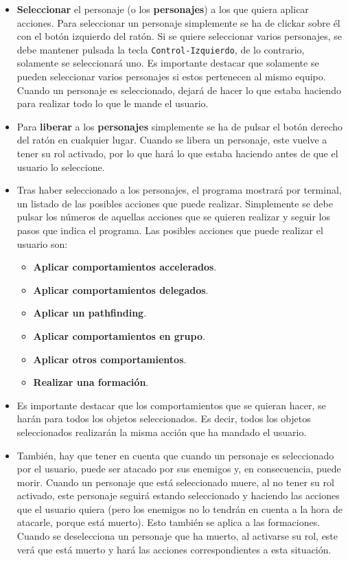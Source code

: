 \begin{itemize}
 \item \textbf{Seleccionar} el personaje (o los \textbf{personajes}) a los que quiera aplicar acciones. Para seleccionar un personaje simplemente se ha de clickar sobre él con el botón izquierdo del ratón. Si se quiere seleccionar varios personajes, se debe mantener pulsada la tecla \texttt{Control-Izquierdo}, de lo contrario, solamente se seleccionará uno. Es importante destacar que solamente se pueden seleccionar varios personajes si estos pertenecen al mismo equipo. Cuando un personaje es seleccionado, dejará de hacer lo que estaba haciendo para realizar todo lo que le mande el usuario.
 
 \item Para \textbf{liberar} a los \textbf{personajes} simplemente se ha de pulsar el botón derecho del ratón en cualquier lugar. Cuando se libera un personaje, este vuelve a tener su rol activado, por lo que hará lo que estaba haciendo antes de que el usuario lo seleccione. 
 
 \item Tras haber seleccionado a los personajes, el programa mostrará por terminal, un listado de las posibles acciones que puede realizar. Simplemente se debe pulsar los números de aquellas acciones que se quieren realizar y seguir los pasos que indica el programa. Las posibles acciones que puede realizar el usuario son:
 \begin{itemize}
  \item \textbf{Aplicar comportamientos accelerados}.
  \item \textbf{Aplicar comportamientos delegados}.
  \item \textbf{Aplicar un pathfinding}.
  \item \textbf{Aplicar comportamientos en grupo}.
  \item \textbf{Aplicar otros comportamientos}.
  \item \textbf{Realizar una formación}.
 \end{itemize}
 
 
 \item Es importante destacar que los comportamientos que se quieran hacer, se harán para todos los objetos seleccionados. Es decir, todos los objetos seleccionados realizarán la misma acción que ha mandado el usuario. 
 
 \item También, hay que tener en cuenta que cuando un personaje es seleccionado por el usuario, puede ser atacado por sus enemigos y, en consecuencia, puede morir. Cuando un personaje que está seleccionado muere, al no tener su rol activado, este personaje seguirá estando seleccionado y haciendo las acciones que el usuario quiera (pero los enemigos no lo tendrán en cuenta a la hora de atacarle, porque está muerto). Esto también se aplica a las formaciones. Cuando se deselecciona un personaje que ha muerto, al activarse su rol, este verá que está muerto y hará las acciones correspondientes a esta situación.
 

\end{itemize}
